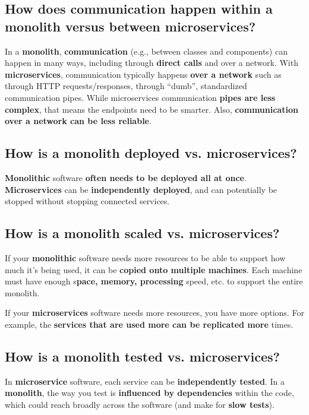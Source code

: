 \subsection{How does communication happen within a monolith versus between microservices?}
In a \textbf{monolith}, \textbf{communication} (e.g., between classes and components) can happen in many ways, including through \textbf{direct calls} and over a network. With \textbf{microservices}, communication typically happens \textbf{over a network} such as through HTTP requests/responses, through ``dumb'', standardized communication pipes. While microservices communication \textbf{pipes are less complex}, that means the endpoints need to be smarter. Also, \textbf{communication over a network can be less reliable}.

\subsection{How is a monolith deployed vs. microservices?}

\textbf{Monolithic} software \textbf{often needs to be deployed all at once}. \textbf{Microservices} can be \textbf{independently deployed}, and can potentially be stopped without stopping connected services.

\subsection{How is a monolith scaled vs. microservices?}

If your \textbf{monolithic} software needs more resources to be able to support how much it's being used, it can be \textbf{copied onto multiple machines}. Each machine must have enough s\textbf{pace, memory, processing} speed, etc. to support the entire monolith.

If your \textbf{microservices} software needs more resources, you have more options. For example, the \textbf{services that are used more can be replicated more} times.

\subsection{How is a monolith tested vs. microservices?}

In \textbf{microservice} software, each service can be \textbf{independently tested}. In a \textbf{monolith}, the way you test is \textbf{influenced by dependencies} within the code, which could reach broadly across the software (and make for \textbf{slow tests}).

